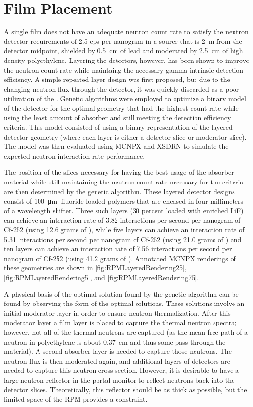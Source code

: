\section{Film Placement}
A single film does not have an adequate neutron count rate to satisfy the neutron detector requirements of 2.5 cps per nanogram  in a source that is \SI{2}{\m} from the detector midpoint, shielded by \SI{0.5}{\cm} of lead and moderated by \SI{2.5}{\cm} of high density polyethylene.
Layering the detectors, however, has been shown to improve the neutron count rate while maintaing the necessary gamma intrinsic detection efficiency.
A simple repeated layer design was first proposed, but due to the changing neutron flux through the detector, it was quickly discarded as a poor utilization of the .
Genetic algorithms were employed to optimize a binary model of the detector for the optimal geometry that had the highest count rate while using the least amount of absorber and still meeting the detection efficiency criteria.
This model consisted of using a binary representation of the layered detector geometry (where each layer is either a detector slice or moderator slice).
The model was then evaluated using MCNPX and XSDRN to simulate the expected neutron interaction rate performance.

The position of the slices necessary for having the best usage of the absorber material while still maintaining the neutron count rate necessary for the criteria are then determined by the genetic algorithm.
These layered detector designs consist of \SI{100}{\um},  fluoride loaded polymers that are encased in four millimeters of a wavelength shifter.
Three such layers (30 percent loaded with enriched LiF) can achieve an interaction rate of 3.82 interactions per second per nanogram of Cf-252 (using 12.6 grams of ), while five layers can achieve an interaction rate of 5.31 interactions per second per nanogram of Cf-252 (using 21.0 grams of )  and ten layers can achieve an interaction rate of 7.56 interactions per second per nanogram of Cf-252 (using 41.2 grams of ).
Annotated MCNPX renderings of these geometries are shown in \autoref{fig:RPMLayeredRendering25}, \autoref{fig:RPMLayeredRendering5}, and \autoref{fig:RPMLayeredRendering75}.

A physical basis of the optimal solution found by the genetic algorithm can be found by observing the form of the optimal solutions.
These solutions involve an initial moderator layer in order to ensure neutron thermalization.
After this moderator layer a film layer is placed to capture the thermal neutron spectra; however, not all of the thermal neutrons are captured (as the mean free path of a neutron in polyethylene is about \SI{0.37}{\cm} and thus some pass through the material).
A second absorber layer is needed to capture those neutrons.  
The neutron flux is then moderated again, and additional layers of detectors are needed to capture this neutron cross section.
However, it is desirable to have a large neutron reflector in the portal monitor to reflect neutrons back into the detector slices. 
Theoretically, this reflector should be as thick as possible, but the limited space of the RPM provides a constraint.

